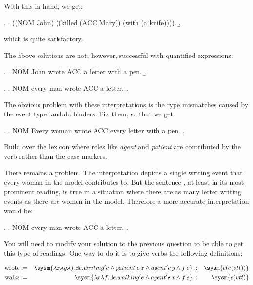 \documentclass[10pt,a4paper]{exam}
\begin{document}
With this in hand, we get:

\ex.
\a. ((NOM John) ((killed (ACC Mary)) (with (a knife)))).
\b. 

which is quite satisfactory.

\begin{questions}
\question[30] The above solutions are not, however, successful with quantified expressions.

\ex.
\a. NOM John wrote ACC a letter with a pen.
\b. 


\ex.
\a. NOM every man wrote ACC a letter.
\b. 


The obvious problem with these interpretations is the type mismatches caused by the event type lambda binders. Fix them, so that we get:


\ex.\label{probex}
\a.\label{probexEx} NOM Every woman wrote ACC every letter with a pen.
\b.\label{probexInt}


Build over the lexicon where roles like \emph{agent} and \emph{patient} are contributed by the verb rather than the case markers.


\question[50] There remains a problem. The interpretation
 depicts a single writing event that every woman in
the model contributes to. But the sentence , at least
in its most prominent reading, is true in a situation where there are
as many letter writing events as there are women in the model.
Therefore a more accurate interpretation would be:


\ex.
\a. NOM every man wrote ACC a letter.
\b. 


You will need to modify  your solution to the previous question to be able to get this type of readings. One way to do it is to give verbs the following definitions:

\[
\begin{align*}
		\text{wrote}   &:=& \sysm{\lambda x\lambda y\lambda f.\exists e . writing' e \land patient' e\, x \land agent' e\, y \land f\, e }  &::& \sysm{e(e(vtt))}\\
	\text{walks}   &:=& \sysm{\lambda x\lambda f . \exists e . walking' e \land agent' e\, x \land f\, e }  &::& \sysm{e(vtt)}
\end{align*}
\]


\end{questions}
\end{document}
